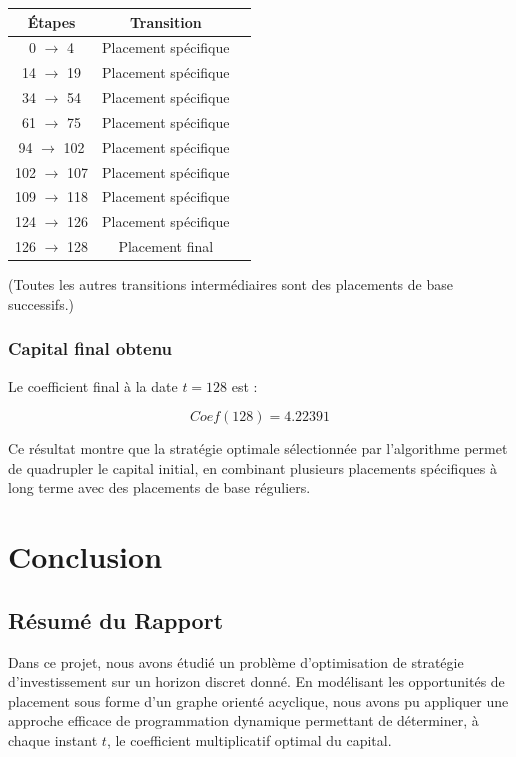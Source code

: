 \documentclass[a4paper,11pt]{article}
\begin{document}
\begin{center}
\begin{tabular}{|c|c|c|}
\hline
Étapes & Transition  \\
\hline
0 $\rightarrow$ 4 & Placement spécifique  \\ 
14 $\rightarrow$ 19 & Placement spécifique  \\
34 $\rightarrow$ 54 & Placement spécifique  \\
61 $\rightarrow$ 75 & Placement spécifique  \\
94 $\rightarrow$ 102 & Placement spécifique  \\
102 $\rightarrow$ 107 & Placement spécifique  \\
109 $\rightarrow$ 118 & Placement spécifique  \\
124 $\rightarrow$ 126 & Placement spécifique  \\
126 $\rightarrow$ 128 & Placement final  \\
\hline
\end{tabular}
\end{center}

(Toutes les autres transitions intermédiaires sont des placements de base successifs.)

\vspace{0.3cm}

\subsubsection{Capital final obtenu}

Le coefficient final à la date $t = 128$ est :

\[
\boxed{Coef(128) = 4.22391}
\]

Ce résultat montre que la stratégie optimale sélectionnée par l’algorithme permet de quadrupler le capital initial, en combinant plusieurs placements spécifiques à long terme avec des placements de base réguliers.



\section{Conclusion}

\subsection*{Résumé du Rapport}

Dans ce projet, nous avons étudié un problème d’optimisation de stratégie d’investissement sur un horizon discret donné.  
En modélisant les opportunités de placement sous forme d’un graphe orienté acyclique, nous avons pu appliquer une approche efficace de programmation dynamique permettant de déterminer, à chaque instant $t$, le coefficient multiplicatif optimal du capital.
\end{document}
